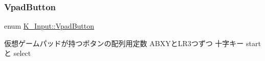 \mbox{\label{namespace_k___input_ab1b3c957b1b7070e86ccd1a908f3a101}} 
\subsubsection{\texorpdfstring{Vpad\+Button}{VpadButton}}
{\footnotesize\ttfamily enum \mbox{\hyperlink{namespace_k___input_ab1b3c957b1b7070e86ccd1a908f3a101}{K\+\_\+\+Input\+::\+Vpad\+Button}}\hspace{0.3cm}{\ttfamily [strong]}}



仮想ゲームパッドが持つボタンの配列用定数 A\+B\+X\+Yと\+L\+R3つずつ 十字キー start と select 


